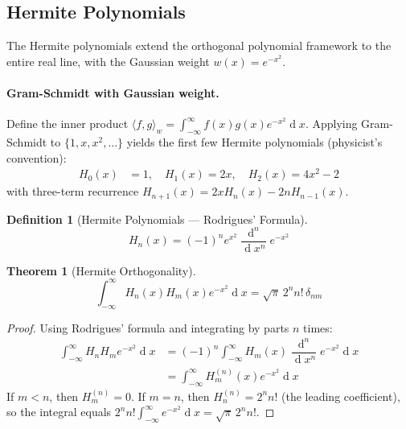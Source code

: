 \documentclass[12pt,a4paper]{report}
\DeclareMathOperator{\deriv}{d}
\theoremstyle{thms}
\newtheorem{theorem}{Theorem}[section]
\theoremstyle{defns}
\newtheorem{definition}{Definition}[section]
\begin{document}
\subsection{Hermite Polynomials}

The Hermite polynomials extend the orthogonal polynomial framework to the entire real line, with the Gaussian weight $w(x) = e^{-x^2}$.

\paragraph{Gram-Schmidt with Gaussian weight.} Define the inner product $\langle f, g \rangle_w = \int_{-\infty}^{\infty} f(x)g(x)e^{-x^2}\deriv{x}$. Applying Gram-Schmidt to $\{1, x, x^2, \ldots\}$ yields the first few Hermite polynomials (physicist's convention):
\begin{align}
    H_0(x) &= 1, \quad H_1(x) = 2x, \quad H_2(x) = 4x^2 - 2
\end{align}
with three-term recurrence $H_{n+1}(x) = 2xH_n(x) - 2nH_{n-1}(x)$.

\begin{definition}[Hermite Polynomials — Rodrigues' Formula]
    \begin{equation}
        H_n(x) = (-1)^n e^{x^2}\dfrac{\deriv^n}{\deriv x^n}e^{-x^2}
        \label{eq:rodrigues_hermite}
    \end{equation}
\end{definition}

\begin{theorem}[Hermite Orthogonality]
    \begin{equation}
        \int_{-\infty}^{\infty} H_n(x)H_m(x)e^{-x^2}\deriv{x} = \sqrt{\pi}\,2^n n!\,\delta_{nm}
    \end{equation}
\end{theorem}

\begin{proof}
    Using Rodrigues' formula and integrating by parts $n$ times:
    \begin{align}
        \int_{-\infty}^{\infty} H_n H_m e^{-x^2}\deriv{x} &= (-1)^n\int_{-\infty}^{\infty} H_m(x)\dfrac{\deriv^n}{\deriv x^n}e^{-x^2}\deriv{x} \\
        &= \int_{-\infty}^{\infty} H_m^{(n)}(x)e^{-x^2}\deriv{x}
    \end{align}
    If $m < n$, then $H_m^{(n)} = 0$. If $m = n$, then $H_n^{(n)} = 2^n n!$ (the leading coefficient), so the integral equals $2^n n!\int_{-\infty}^{\infty} e^{-x^2}\deriv{x} = \sqrt{\pi}\,2^n n!$.
\end{proof}
\end{document}
